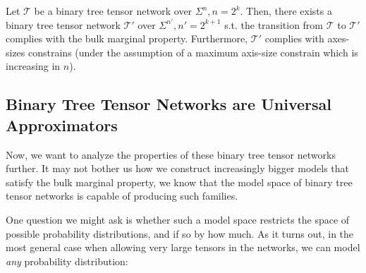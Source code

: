\documentclass[../../main.tex]{subfiles}
\begin{document}
    \begin{corollary}
        Let $\mathcal{T}$ be a binary tree tensor network over $\Sigma^n, n = 2^k$. Then, there exists a binary tree tensor network $\mathcal{T}'$ over $\Sigma^{n'}, n' = 2^{k+1}$ s.t. the transition from $\mathcal{T}$ to $\mathcal{T}'$ complies with the bulk marginal property. Furthermore, $\mathcal{T}'$ complies with axes-sizes constrains (under the assumption of a maximum axis-size constrain which is increasing in $n$).
    \end{corollary}

\subsection{Binary Tree Tensor Networks are Universal Approximators}
    Now, we want to analyze the properties of these binary tree tensor networks further. It may not bother us how we construct increasingly bigger models that satisfy the bulk marginal property, we know that the model space of binary tree tensor networks is capable of producing such families.

    One question we might ask is whether such a model space restricts the space of possible probability distributions, and if so by how much. As it turns out, in the most general case when allowing very large tensors in the networks, we can model \emph{any} probability distribution:
\end{document}
